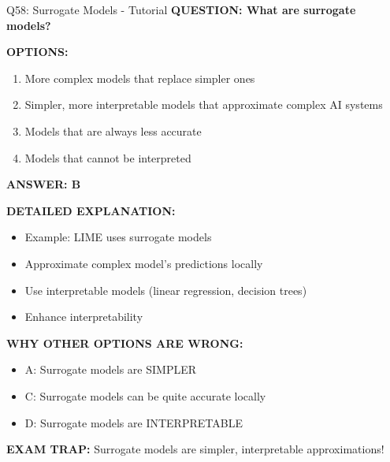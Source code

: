 \documentclass[8pt]{beamer}
\begin{document}
	\begin{frame}{Q58: Surrogate Models - Tutorial}
		\fontsize{6.5}{7.5}\selectfont
		\textbf{QUESTION: What are surrogate models?}
		
		\vspace{0.1cm}
		\textbf{OPTIONS:}
		\begin{enumerate}
			\item More complex models that replace simpler ones
			\item Simpler, more interpretable models that approximate complex AI systems
			\item Models that are always less accurate
			\item Models that cannot be interpreted
		\end{enumerate}
		
		\vspace{0.1cm}
		\textcolor{myblue}{\textbf{ANSWER: B}}
		
		\vspace{0.1cm}
		\textbf{DETAILED EXPLANATION:}
		\begin{itemize}
			\item Example: LIME uses surrogate models
			\item Approximate complex model's predictions locally
			\item Use interpretable models (linear regression, decision trees)
			\item Enhance interpretability
		\end{itemize}
		
		\vspace{0.1cm}
		\textcolor{myred}{\textbf{WHY OTHER OPTIONS ARE WRONG:}}
		\begin{itemize}
			\item \textcolor{myred}{A:} Surrogate models are SIMPLER
			\item \textcolor{myred}{C:} Surrogate models can be quite accurate locally
			\item \textcolor{myred}{D:} Surrogate models are INTERPRETABLE
		\end{itemize}
		
		\textcolor{myred}{\textbf{EXAM TRAP:}} Surrogate models are \textcolor{myblue}{simpler, interpretable approximations}!
	\end{frame}
	
\end{document}
